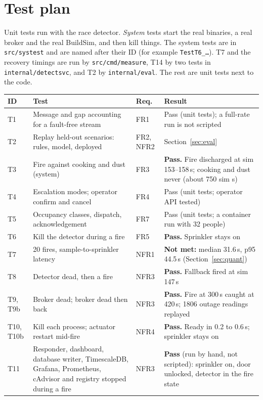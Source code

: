 \documentclass[11pt]{article}
\newcommand{\code}[1]{\texttt{#1}}
\begin{document}
\section{Test plan}\label{sec:tests}

Unit tests run with the race detector. \emph{System} tests start the real binaries, a real broker and the real BuildSim, and then kill things. The system tests are in \code{src/systest} and are named after their ID (for example \code{TestT6\_\dots}). T7 and the recovery timings are run by \code{src/cmd/measure}, T14 by two tests in \code{internal/detectsvc}, and T2 by \code{internal/eval}. The rest are unit tests next to the code.

{\setlength{\extrarowheight}{1pt}\begin{longtable}{@{}L{1.6cm}L{6.2cm}L{1.9cm}L{5.9cm}@{}}
\toprule
ID & Test & Req. & Result\\
\midrule\endhead
T1 & Message and gap accounting for a fault-free stream & FR1 & Pass (unit tests); a full-rate run is not scripted\\
T2 & Replay held-out scenarios: rules, model, deployed & FR2, NFR2 & Section~\ref{sec:eval}\\
T3 & Fire against cooking and dust (system) & FR3 & \textbf{Pass.} Fire discharged at sim 153--158\,s; cooking and dust never (about 750 sim s)\\
T4 & Escalation modes; operator confirm and cancel & FR4 & Pass (unit tests; operator API tested)\\
T5 & Occupancy classes, dispatch, acknowledgement & FR7 & Pass (unit tests; a container run with 32 people)\\
T6 & Kill the detector during a fire & FR5 & \textbf{Pass.} Sprinkler stays on\\
T7 & 20 fires, sample-to-sprinkler latency & NFR1 & \textbf{Not met:} median 31.6\,s, p95 44.5\,s (Section~\ref{sec:quant})\\
T8 & Detector dead, then a fire & NFR3 & \textbf{Pass.} Fallback fired at sim 147\,s\\
T9, T9b & Broker dead; broker dead then back & NFR3 & \textbf{Pass.} Fire at 300\,s caught at 420\,s; 1806 outage readings replayed\\
T10, T10b & Kill each process; actuator restart mid-fire & NFR4 & \textbf{Pass.} Ready in 0.2 to 0.6\,s; sprinkler stays on\\
T11 & Responder, dashboard, database writer, TimescaleDB, Grafana, Prometheus, cAdvisor and registry stopped during a fire & NFR3 & \textbf{Pass} (run by hand, not scripted): sprinkler on, door unlocked, detector in the fire state\\

\end{longtable}}
\end{document}

